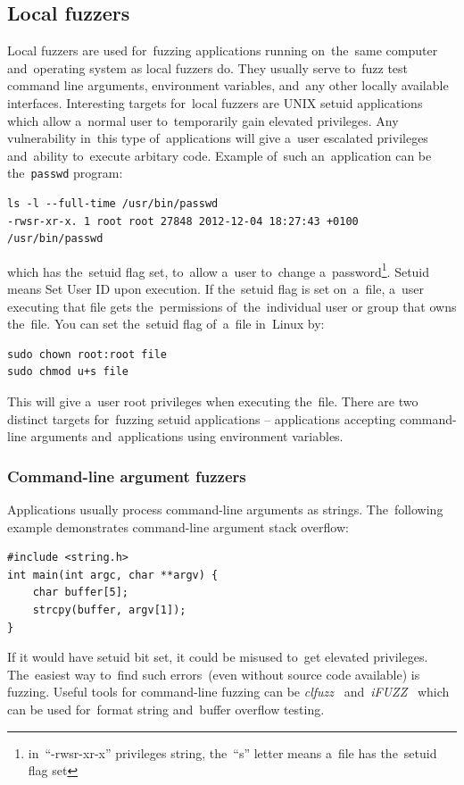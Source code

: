 \subsection{Local fuzzers}
Local fuzzers are used for~fuzzing applications running on~the~same computer
and~operating system as local fuzzers do. They usually serve to~fuzz test command
line arguments, environment variables, and~any other locally available interfaces.
Interesting targets for~local fuzzers are UNIX setuid applications which allow
a~normal user to~temporarily gain elevated privileges. Any vulnerability in~this
type of~applications will give a~user escalated privileges and~ability to~execute
arbitary code. Example of~such an~application can be the~\texttt{passwd} program:
\begin{lstlisting}[frame=single]
ls -l --full-time /usr/bin/passwd
-rwsr-xr-x. 1 root root 27848 2012-12-04 18:27:43 +0100 /usr/bin/passwd 
\end{lstlisting}
which has the~setuid flag set, to~allow a~user to~change
a~password\footnote{in~``-rwsr-xr-x'' privileges string, the~``s'' letter means
a~file has the~setuid flag set}. Setuid means Set User ID upon execution.
If the~setuid flag is set on~a~file, a~user executing that file gets
the~permissions of~the~individual user or group that owns the~file. You can set
the~setuid flag of~a~file in~Linux by:
\begin{lstlisting}[frame=single]
sudo chown root:root file
sudo chmod u+s file
\end{lstlisting}
This will give a~user root privileges when executing the~file. There are two
distinct targets for~fuzzing setuid applications -- applications accepting
command-line arguments and~applications using environment variables.

\subsubsection{Command-line argument fuzzers}
Applications usually process command-line arguments as strings. The~following
example demonstrates command-line argument stack overflow:
\begin{lstlisting}[frame=single]
#include <string.h>
int main(int argc, char **argv) {
    char buffer[5];
    strcpy(buffer, argv[1]);
}
\end{lstlisting}
If it would have setuid bit set, it could be misused to~get elevated privileges.
The~easiest way to~find such errors~(even without source code available)
is fuzzing. Useful tools for command-line fuzzing can be
\emph{clfuzz}~\cite{clfuzz} and~\emph{iFUZZ}~\cite{fuzzing.org}
which can be used for~format string and~buffer overflow testing.

